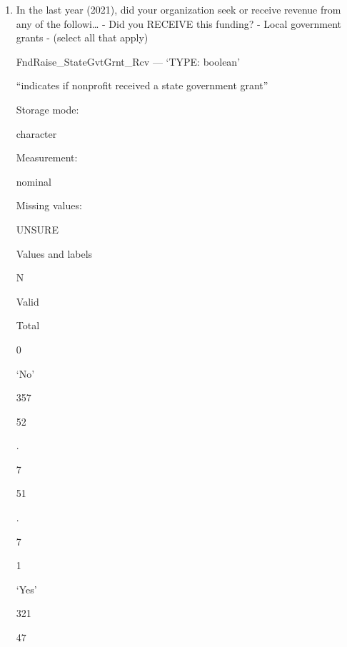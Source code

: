 \documentclass[
  letterpaper,
]{scrbook}
\providecommand{\tightlist}{%
  \setlength{\itemsep}{0pt}\setlength{\parskip}{0pt}}\usepackage{longtable,booktabs,array}
\begin{document}
\begin{enumerate}
\begin{enumerate}
\begin{enumerate}
\begin{enumerate}
\begin{enumerate}
\begin{enumerate}
\begin{enumerate}
\begin{enumerate}
\begin{enumerate}
\begin{enumerate}
\begin{enumerate}
\begin{enumerate}
\begin{enumerate}
                          \begin{enumerate}
                          \def\labelenumxiv{\arabic{enumxiv}.}
                          \tightlist
                          \item
                            In the last year (2021), did your
                            organization seek or receive revenue from
                            any of the followi\ldots{} - Did you RECEIVE
                            this funding? - Local government grants -
                            (select all that apply)

                            FndRaise\_StateGvtGrnt\_Rcv --- {`TYPE:
                            boolean'}

                            ``indicates if nonprofit received a state
                            government grant''

                            Storage mode:

                            character

                            Measurement:

                            nominal

                            Missing values:

                            UNSURE

                            Values and labels

                            N

                            Valid

                            Total

                            0

                            `No'

                            357

                            52

                            .

                            7

                            51

                            .

                            7

                            1

                            `Yes'

                            321

                            47


\end{enumerate}
\end{enumerate}
\end{enumerate}
\end{enumerate}
\end{enumerate}
\end{enumerate}
\end{enumerate}
\end{enumerate}
\end{enumerate}
\end{enumerate}
\end{enumerate}
\end{enumerate}
\end{enumerate}
\end{enumerate}
\end{document}
